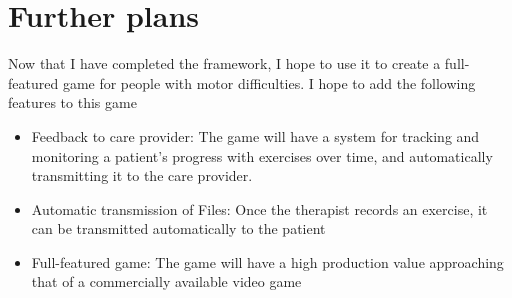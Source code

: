 \documentclass{article}
\begin{document}
\section{Further plans}
Now that I have completed the framework, I hope to use it to create a full-featured game for people with motor difficulties. I hope to add the following features to this game

\begin{itemize}
	\item Feedback to care provider: The game will have a system for tracking and monitoring a patient's progress with exercises over time, and automatically transmitting it to the care provider.

	\item Automatic transmission of Files: Once the therapist records an exercise, it can be transmitted automatically to the patient

	\item Full-featured game: The game will have a high production value approaching that of a commercially available video game
\end{itemize}
\end{document}
